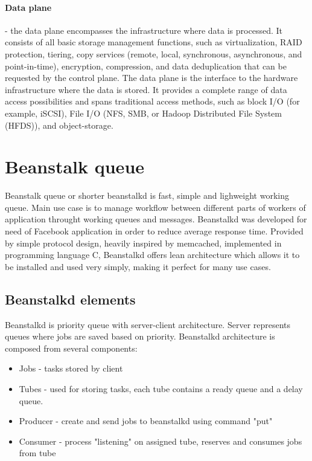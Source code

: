     \paragraph{Data plane}
    - the data plane encompasses the infrastructure where data is processed. It consists of all basic storage management functions, such as virtualization, RAID protection, tiering, copy services (remote, local, synchronous, asynchronous, and point-in-time), encryption, compression, and data deduplication that can be requested by the control plane. The data plane is the interface to the hardware infrastructure where the data is stored. It provides a complete range of data access possibilities and spans traditional access methods, such as block I/O (for example, iSCSI), File I/O (NFS, SMB, or Hadoop Distributed File System (HFDS)), and object-storage\cite{sdsIBMSDSGuide}.


\section{Beanstalk queue}

    Beanstalk queue or shorter beanstalkd is fast, simple and lighweight working queue\cite{}. Main use case is to manage workflow between different parts of workers of application throught working queues and messages. Beanstalkd was developed for need of Facebook application in order to reduce average response time\cite{beanstalkdOfficial}. Provided by simple protocol design, heavily inspired by memcached, implemented in programming language C, Beanstalkd offers lean architecture which allows it to be installed and used very simply, making it perfect for many use cases\cite{beanstalkdInstall}.


    \subsection{Beanstalkd elements}
    Beanstalkd is priority queue with server-client architecture. Server represents queues where jobs are saved based on priority. Beanstalkd architecture is composed from several components:
    \begin{itemize}
        \item Jobs - tasks stored by client
        \item Tubes - used for storing tasks, each tube contains a ready queue and a delay queue.
        \item Producer - create and send jobs to beanstalkd using command "put"
        \item Consumer - process "listening" on assigned tube, reserves and consumes jobs from tube
    \end{itemize}

